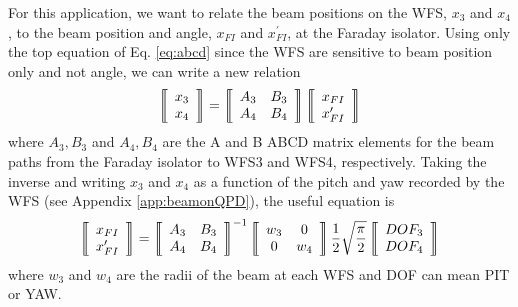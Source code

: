For this application, we want to relate the beam positions on the WFS,
$x_{3}$ and $x_{4}$, to the beam position and angle, $x_{FI}$ and
$x^{\prime}_{FI}$, at the Faraday isolator. Using only the top
equation of Eq. \ref{eq:abcd} since the WFS are sensitive to beam
position only and not angle, we can write a new relation
\begin{equation}
\left \llbracket \begin{array}{c} 
x_3 \\
x_4 \end{array} \right\rrbracket =
\left\llbracket \begin{array}{c c}
A_3 & B_3 \\
A_4 & B_4 \end{array} \right\rrbracket
\left \llbracket \begin{array}{c} 
x_{FI} \\
x^{\prime}_{FI} \end{array} \right\rrbracket
\end{equation}
where ${A_3, B_3}$ and ${A_4, B_4}$ are the A and B ABCD matrix
elements for the beam paths from the Faraday isolator to WFS3 and
WFS4, respectively. Taking the inverse and writing $x_3$ and $x_4$ as
a function of the pitch and yaw recorded by the WFS (see Appendix
\ref{app:beamonQPD}), the useful equation is
\begin{equation}
\left \llbracket \begin{array}{c} 
x_{FI} \\
x^{\prime}_{FI} \end{array} \right\rrbracket =
\left\llbracket \begin{array}{c c}
A_3 & B_3 \\
A_4 & B_4 \end{array} \right\rrbracket^{-1}
\left\llbracket \begin{array}{c c}
w_3 & 0 \\
0 & w_4 \end{array} \right\rrbracket
\frac{1}{2} \sqrt{\frac{\pi}{2}} 
\left \llbracket \begin{array}{c} 
DOF_3 \\
DOF_4 \end{array} \right\rrbracket
\end{equation}
where $w_3$ and $w_4$ are the radii of the beam at each WFS and
DOF can mean PIT or YAW.







